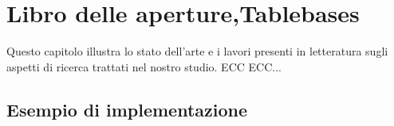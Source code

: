 \chapter{Libro delle aperture,Tablebases} %
%

\begin{citazione}
Questo capitolo illustra lo stato dell'arte e i lavori presenti in letteratura sugli aspetti di ricerca trattati nel nostro studio. ECC ECC...
\end{citazione}

\newpage

\section{Esempio di implementazione}